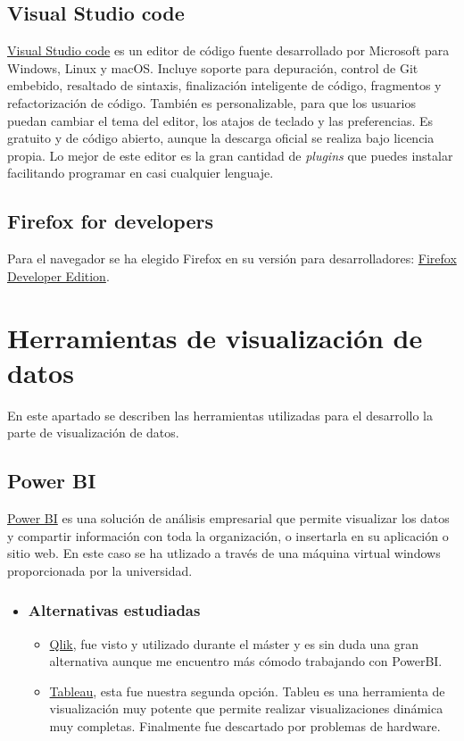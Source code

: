 \subsection{Visual Studio code}\label{herramientas_atom}
\href{https://code.visualstudio.com}{Visual Studio code} es un editor de código fuente desarrollado por Microsoft para Windows, Linux y macOS. Incluye soporte para depuración, control de Git embebido, resaltado de sintaxis, finalización inteligente de código, fragmentos y refactorización de código. También es personalizable, para que los usuarios puedan cambiar el tema del editor, los atajos de teclado y las preferencias. Es gratuito y de código abierto, aunque la descarga oficial se realiza bajo licencia propia. Lo mejor de este editor es la gran cantidad de \textit{plugins} que puedes instalar facilitando programar en casi cualquier lenguaje.

\subsection{Firefox for developers}\label{herramientas_firefox}
Para el navegador se ha elegido Firefox en su versión para desarrolladores: \href{https://www.mozilla.org/es-ES/firefox/developer}{Firefox Developer Edition}.


\section{Herramientas de visualización de datos}\label{herramientasdataviz}
En este apartado se describen las herramientas utilizadas para el desarrollo la parte de visualización de datos.

\subsection{Power BI}
\href{https://powerbi.microsoft.com}{Power BI} es una solución de análisis empresarial que permite visualizar los datos y compartir información con toda la organización, o insertarla en su aplicación o sitio web. En este caso se ha utlizado a través de una máquina virtual windows proporcionada por la universidad.

\begin{itemize}
	\item \subsubsection{Alternativas estudiadas}
	\begin{itemize}
		\item \href{https://www.qlik.com/us}{Qlik}, fue visto y utilizado durante el máster y es sin duda una gran alternativa aunque me encuentro más cómodo trabajando con PowerBI.
		\item \href{https://www.tableau.com}{Tableau}, esta fue nuestra  segunda opción. Tableu es una herramienta de visualización muy potente que permite realizar visualizaciones dinámica muy completas. Finalmente fue descartado por problemas de hardware. 
	\end{itemize}
\end{itemize}

